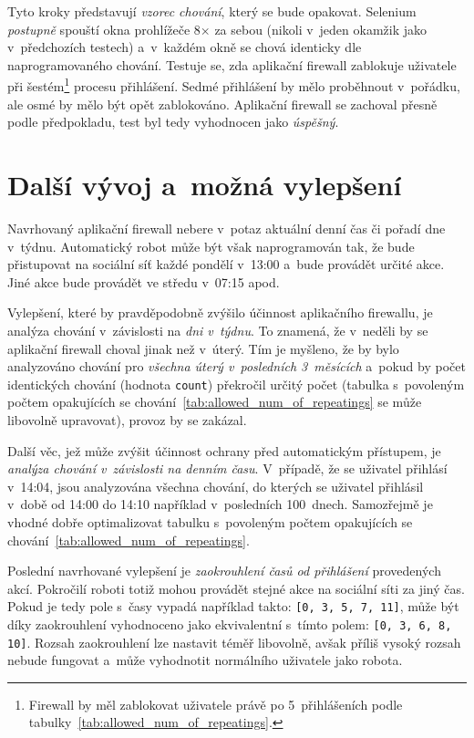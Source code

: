 \noindent
Tyto kroky představují \textit{vzorec chování}, který se bude opakovat. Selenium \textit{postupně} spouští okna prohlížeče 8$\times$ za sebou (nikoli v~jeden okamžik jako v~předchozích testech) a~v~každém okně se chová identicky dle naprogramovaného chování. Testuje se, zda aplikační firewall zablokuje uživatele při šestém\footnote{Firewall by měl zablokovat uživatele právě po 5~přihlášeních podle tabulky~\ref{tab:allowed_num_of_repeatings}.} procesu přihlášení. Sedmé přihlášení by mělo proběhnout v~pořádku, ale osmé by mělo být opět zablokováno. Aplikační firewall se zachoval přesně podle předpokladu, test byl tedy vyhodnocen jako \textit{úspěšný}.

\section{Další vývoj a~možná vylepšení}
Navrhovaný aplikační firewall nebere v~potaz aktuální denní čas či pořadí dne v~týdnu. Automatický robot může být však naprogramován tak, že bude přistupovat na sociální síť každé pondělí v~13:00 a~bude provádět určité akce. Jiné akce bude provádět ve středu v~07:15 apod.

Vylepšení, které by pravděpodobně zvýšilo účinnost aplikačního firewallu, je analýza chování v~závislosti na \textit{dni v~týdnu}. To znamená, že v~neděli by se aplikační firewall choval jinak než v~úterý. Tím je myšleno, že by bylo analyzováno chování pro \textit{všechna úterý v~posledních 3~měsících} a~pokud by počet identických chování (hodnota \texttt{count}) překročil určitý počet (tabulka s~povoleným počtem opakujících se chování~\ref{tab:allowed_num_of_repeatings} se může libovolně upravovat), provoz by se zakázal. 

Další věc, jež může zvýšit účinnost ochrany před automatickým přístupem, je \textit{analýza chování v~závislosti na denním času}. V~případě, že se uživatel přihlásí v~14:04, jsou analyzována všechna chování, do kterých se uživatel přihlásil v~době od 14:00 do 14:10 například v~posledních 100~dnech. Samozřejmě je vhodné dobře optimalizovat tabulku s~povoleným počtem opakujících se chování~\ref{tab:allowed_num_of_repeatings}. 

Poslední navrhované vylepšení je \textit{zaokrouhlení časů od přihlášení} provedených akcí. Pokročilí roboti totiž mohou provádět stejné akce na sociální síti za jiný čas. Pokud je tedy pole s~časy vypadá například takto: \texttt{[0, 3, 5, 7, 11]}, může být díky zaokrouhlení vyhodnoceno jako ekvivalentní s~tímto polem: \texttt{[0, 3, 6, 8, 10]}. Rozsah zaokrouhlení lze nastavit téměř libovolně, avšak příliš vysoký rozsah nebude fungovat a~může vyhodnotit normálního uživatele jako robota.

